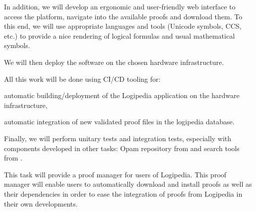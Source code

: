 \begin{workpackage}[id=access,type=RTD,wphases=1-48,
  short=Access,%
  title={Access},
  lead=Inr,InrRM=54,OcaRM=6]
\begin{tasklist}
\begin{task}[id=web,
      title=Giving access to the infrastructure on the world-wide web,
      shorttitle=Web,
      lead=Inr,InrRM=12,wphases=7-18]
    In addition, we will develop an ergonomic and user-friendly web
    interface to access the platform, navigate into the available
    proofs and download them. To this end, we will use appropriate
    languages and tools (Unicode symbols, CCS, etc.) to provide a nice
    rendering of logical formulas and usual mathematical symbols.
    
    We will then deploy the software on the chosen hardware
    infrastructure.

    All this work will be done using CI/CD tooling for:
    \begin{compactitem}
    \item automatic building/deployment of the Logipedia application
      on the hardware infrastructure,
    \item automatic integration of new validated proof files in the
      logipedia database.
    \end{compactitem}

    Finally, we will perform unitary tests and integration tests,
    especially with components developed in other tasks: Opam
    repository from  and search tools from
    .
  \end{task}

  \begin{task}[id=opam,
      title=Giving access to the infrastructure in proof systems,
      shorttitle=Syst.,
      lead=Oca,OcaRM=6,wphases=13-18]
    This task will provide a proof manager for users of Logipedia. This proof
    manager will enable users to automatically download and install
    proofs as well as their dependencies in order to ease the
    integration of proofs from Logipedia in their own developments.


\end{task}
\end{tasklist}
\end{workpackage}
